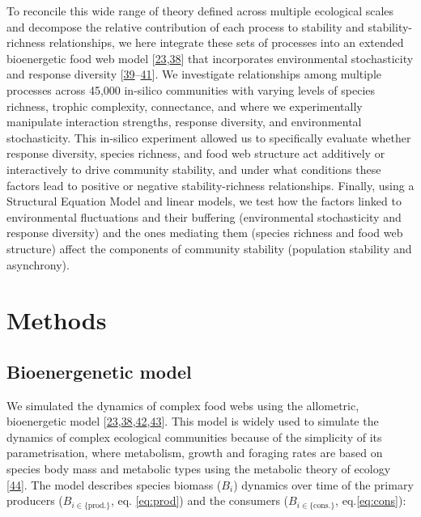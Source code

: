 \documentclass[
]{article}
\begin{document}
To reconcile this wide range of theory defined across multiple ecological
scales and decompose the relative contribution of each process to stability and
stability-richness relationships, we here integrate these sets of processes
into an extended bioenergetic food web model {[}\protect\hyperlink{ref-brose_allometric_2006}{23},\protect\hyperlink{ref-yodzis_body_1992}{38}{]} that incorporates
environmental stochasticity and response diversity {[}\protect\hyperlink{ref-vasseur_environmental_2007}{39}--\protect\hyperlink{ref-ripa_food_2003}{41}{]}. We investigate
relationships among multiple processes across 45,000 in-silico communities with
varying levels of species richness, trophic complexity, connectance, and where
we experimentally manipulate interaction strengths, response diversity, and
environmental stochasticity. This in-silico experiment allowed us to
specifically evaluate whether response diversity, species richness, and food
web structure act additively or interactively to drive community stability, and
under what conditions these factors lead to positive or negative
stability-richness relationships. Finally, using a Structural Equation Model
and linear models, we test how the factors linked to environmental fluctuations
and their buffering (environmental stochasticity and response diversity) and
the ones mediating them (species richness and food web structure) affect the
components of community stability (population stability and asynchrony).

\hypertarget{methods}{%
\section{Methods}\label{methods}}

\hypertarget{bioenergenetic-model}{%
\subsection{Bioenergenetic model}\label{bioenergenetic-model}}

We simulated the dynamics of complex food webs using the allometric,
bioenergetic model {[}\protect\hyperlink{ref-brose_allometric_2006}{23},\protect\hyperlink{ref-yodzis_body_1992}{38},\protect\hyperlink{ref-rooney_homage_2006}{42},\protect\hyperlink{ref-lajaaiti_ecologicalnetworksdynamicsjl_2025}{43}{]}. This model is widely used to simulate the
dynamics of complex ecological communities because of the simplicity of its
parametrisation, where metabolism, growth and foraging rates are based on
species body mass and metabolic types using the metabolic theory of ecology
{[}\protect\hyperlink{ref-brown_toward_2004}{44}{]}. The model describes species biomass (\(B_i\)) dynamics over
time of the primary producers (\(B_{i \in \{\mathrm{prod.}\}}\), eq.
\eqref{eq:prod}) and the consumers (\(B_{i \in \{\mathrm{cons.}\}}\),
eq.\eqref{eq:cons}):
\end{document}
